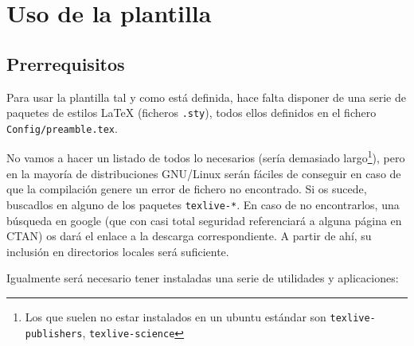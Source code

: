 \documentclass[spanish,openright]{book}
\begin{document}
\section{Uso de la plantilla}
\label{sec:uso-generico-de}


\subsection{Prerrequisitos}
\label{sec:prerrequisitos}

Para usar la plantilla tal y como está definida, hace falta disponer de
una serie de paquetes de estilos \LaTeX{} (ficheros \texttt{.sty}),
todos ellos definidos en el fichero \texttt{Config/preamble.tex}.

No vamos a hacer un listado de todos lo necesarios (sería demasiado
largo\footnote{Los que suelen no estar instalados en un ubuntu estándar
  son \texttt{texlive-publishers}, \texttt{texlive-science}}), pero en
la mayoría de distribuciones GNU/Linux serán fáciles de conseguir en
caso de que la compilación genere un error de fichero no encontrado. Si
os sucede, buscadlos en alguno de los paquetes \texttt{texlive-*}. En
caso de no encontrarlos, una búsqueda en google (que con casi total
seguridad referenciará a alguna página en CTAN) os dará el enlace a la
descarga correspondiente. A partir de ahí, su inclusión en directorios
locales será suficiente.


Igualmente será necesario tener instaladas una serie de utilidades y
aplicaciones:
\end{document}
